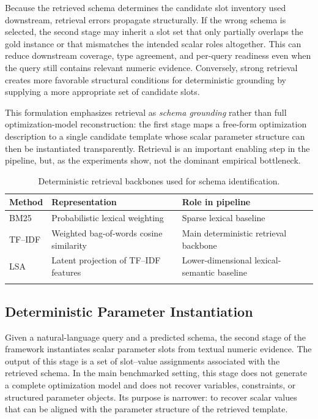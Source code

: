 \documentclass[pdflatex,sn-basic,Numbered]{sn-jnl}
\begin{document}
Because the retrieved schema determines the candidate slot inventory used downstream, retrieval errors propagate structurally. If the wrong schema is selected, the second stage may inherit a slot set that only partially overlaps the gold instance or that mismatches the intended scalar roles altogether. This can reduce downstream coverage, type agreement, and per-query readiness even when the query still contains relevant numeric evidence. Conversely, strong retrieval creates more favorable structural conditions for deterministic grounding by supplying a more appropriate set of candidate slots.

This formulation emphasizes retrieval as \emph{schema grounding} rather than full optimization-model reconstruction: the first stage maps a free-form optimization description to a single candidate template whose scalar parameter structure can then be instantiated transparently. Retrieval is an important enabling step in the pipeline, but, as the experiments show, not the dominant empirical bottleneck.

\begin{table}[t]
\centering
\caption{Deterministic retrieval backbones used for schema identification.}
\label{tab:retrieval_backbones}
\small
\begin{tabularx}{\linewidth}{l l X}
\toprule
Method & Representation & Role in pipeline \\
\midrule
BM25 & Probabilistic lexical weighting & Sparse lexical baseline \\
TF--IDF & Weighted bag-of-words cosine similarity & Main deterministic retrieval backbone \\
LSA & Latent projection of TF--IDF features & Lower-dimensional lexical-semantic baseline \\
\botrule
\end{tabularx}
\end{table}

\subsection{Deterministic Parameter Instantiation}
\label{subsec:method_instantiation}

Given a natural-language query and a predicted schema, the second stage of the framework instantiates scalar parameter slots from textual numeric evidence. The output of this stage is a set of slot--value assignments associated with the retrieved schema. In the main benchmarked setting, this stage does not generate a complete optimization model and does not recover variables, constraints, or structured parameter objects. Its purpose is narrower: to recover scalar values that can be aligned with the parameter structure of the retrieved template.
\end{document}
